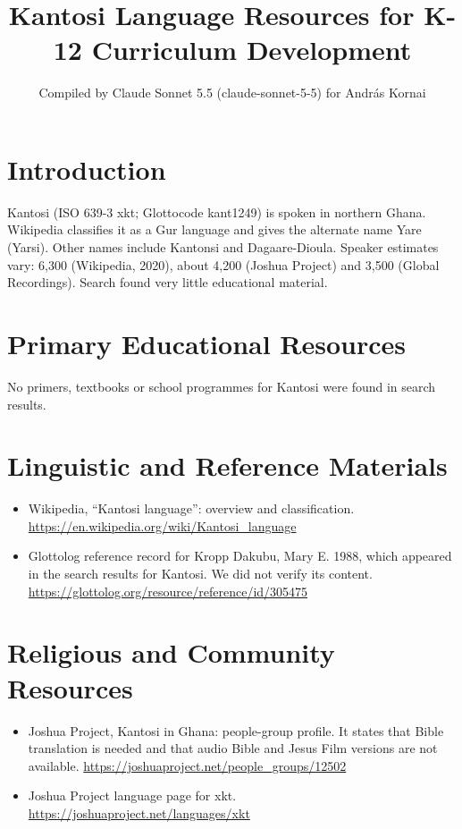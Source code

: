 \documentclass[12pt]{article}
\title{Kantosi Language Resources for K-12 Curriculum Development}
\author{Compiled by Claude Sonnet 5.5 (claude-sonnet-5-5) for Andr\'as Kornai}
\date{}
\begin{document}
\maketitle

\section{Introduction}
Kantosi (ISO 639-3 xkt; Glottocode kant1249) is spoken in northern Ghana. Wikipedia classifies it as a Gur language and gives the alternate name Yare (Yarsi). Other names include Kantonsi and Dagaare-Dioula. Speaker estimates vary: 6,300 (Wikipedia, 2020), about 4,200 (Joshua Project) and 3,500 (Global Recordings). Search found very little educational material.

\section{Primary Educational Resources}
No primers, textbooks or school programmes for Kantosi were found in search results.

\section{Linguistic and Reference Materials}
\begin{itemize}
\item Wikipedia, ``Kantosi language'': overview and classification. \url{https://en.wikipedia.org/wiki/Kantosi_language}
\item Glottolog reference record for Kropp Dakubu, Mary E. 1988, which appeared in the search results for Kantosi. We did not verify its content. \url{https://glottolog.org/resource/reference/id/305475}
\end{itemize}

\section{Religious and Community Resources}
\begin{itemize}
\item Joshua Project, Kantosi in Ghana: people-group profile. It states that Bible translation is needed and that audio Bible and Jesus Film versions are not available. \url{https://joshuaproject.net/people_groups/12502}
\item Joshua Project language page for xkt. \url{https://joshuaproject.net/languages/xkt}
\end{itemize}
\end{document}
